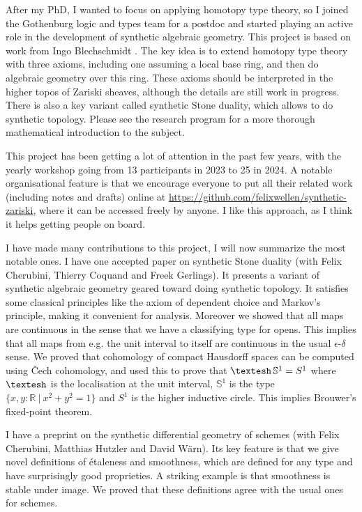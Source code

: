 \documentclass{article}
\newcommand{\shape}{\textrm{\textesh}}
\begin{document}
After my PhD, I wanted to focus on applying homotopy type theory, so I joined the Gothenburg logic and types team for a postdoc and started playing an active role in the development of synthetic algebraic geometry. This project is based on work from Ingo Blechschmidt \cite{blechschmidt2024nullstellensatz}. The key idea is to extend homotopy type theory with three axioms, including one assuming a local base ring, and then do algebraic geometry over this ring. These axioms should be interpreted in the higher topos of Zariski sheaves, although the details are still work in progress. There is also a key variant called synthetic Stone duality, which allows to do synthetic topology. Please see the research program for a more thorough mathematical introduction to the subject. 

This project has been getting a lot of attention in the past few years, with the yearly workshop going from 13 participants in 2023 to 25 in 2024. A notable organisational feature is that we encourage everyone to put all their related work (including notes and drafts) online at \url{https://github.com/felixwellen/synthetic-zariski}, where it can be accessed freely by anyone. I like this approach, as I think it helps getting people on board.

I have made many contributions to this project, I will now summarize the most notable ones. I have one accepted paper on synthetic Stone duality (with Felix Cherubini, Thierry Coquand and Freek Gerlings). It presents a variant of synthetic algebraic geometry geared toward doing synthetic topology. It satisfies some classical principles like the axiom of dependent choice and Markov's principle, making it convenient for analysis. Moreover we showed that all maps are continuous in the sense that we have a classifying type for opens. This implies that all maps from e.g. the unit interval to itself are continuous in the usual $\epsilon$-$\delta$ sense. We proved that cohomology of compact Hausdorff spaces can be computed using \v{C}ech cohomology, and used this to prove that $\shape\, \mathbb{S}^1 = S^1$ where $\shape$ is the localisation at the unit interval, $\mathbb{S}^1$ is the type $\{x,y:\mathbb{R}\ |\ x^2+y^2=1\}$ and $S^1$ is the higher inductive circle. This implies Brouwer's fixed-point theorem.

I have a preprint on the synthetic differential geometry of schemes (with Felix Cherubini, Matthias Hutzler and David W\"arn). Its key feature is that we give novel definitions of \'etaleness and smoothness, which are defined for any type and have surprisingly good proprieties. A striking example is that smoothness is stable under image. We proved that these definitions agree with the usual ones for schemes.
\end{document}
